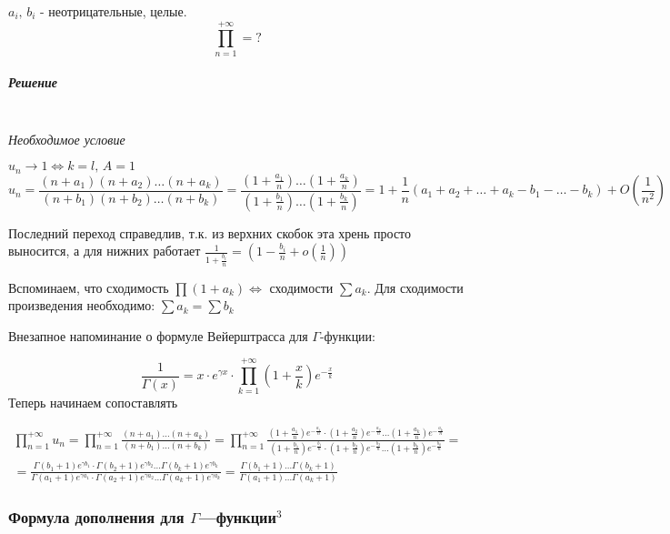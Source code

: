 \documentclass{article}
\let\vanillasubparagraph\subparagraph
\renewcommand{\subparagraph}[1]{\vanillasubparagraph{#1}\mbox{}\\}
\begin{document}
$a_i,\, b_i$ - неотрицательные, целые.
$$
\prod_{n=1}^{+\infty} = ?
$$

\subparagraph{Решение}
\textit{Необходимое условие}

$u_n \to 1 \Leftrightarrow k = l,\, A=1$
$$
u_n = \frac{(n + a_1)(n + a_2) \ldots (n + a_k)}{(n+b_1)(n+b_2) \ldots (n+b_k)} = \frac{\left(1 + \frac{a_1}{n}\right)\ldots\left(1 + \frac{a_k}{n}\right)}{\left(1 + \frac{b_1}{n}\right)\ldots \left(1 + \frac{b_k}{n}\right)} = 1 + \frac{1}{n}\left(a_1 + a_2 + \ldots + a_k - b_1 - \ldots - b_k\right) + O\left(\frac{1}{n^2}\right)
$$

Последний переход справедлив, т.к. из верхних скобок эта хрень просто выносится, а для нижних работает $\frac{1}{1 + \frac{b_i}{n}} = \left(1 - \frac{b_i}{n} + o\left(\frac{1}{n}\right)\right)$

Вспоминаем, что сходимость $\prod(1 + a_k) \Leftrightarrow$ сходимости $\sum a_k$. Для сходимости произведения необходимо: $\sum a_k = \sum b_k$

Внезапное напоминание о формуле Вейерштрасса для $\Gamma$-функции:

$$
\frac{1}{\Gamma(x)} = x \cdot e^{\gamma x} \cdot \prod_{k=1}^{+\infty} \left(1 + \frac{x}{k}\right) e^{-\frac{x}{k}}
$$
Теперь начинаем сопоставлять

\begin{multline*}
    \prod_{n=1}^{+\infty} u_n = \prod_{n=1}^{+\infty} \frac{(n + a_1) \ldots (n + a_k)} {(n + b_1) \ldots (n + b_k)} = \prod_{n=1}^{+\infty} \frac{\left(1 + \frac{a_1}{n}\right)e^{-\frac{a_1}{n}} \cdot \left(1 + \frac{a_2}{n}\right)e^{-\frac{a_2}{n}} \ldots \left(1 + \frac{a_k}{n}\right)e^{-\frac{a_k}{n}}}{\left(1 + \frac{b_1}{n}\right) e^{-\frac{b_1}{n}}\cdot \left(1 + \frac{b_2}{n}\right) e^{-\frac{b_2}{n}} \ldots \left(1 + \frac{b_k}{n}\right) e^{-\frac{b_k}{n}}} = \\ = \frac{\Gamma(b_1+1) e^{\gamma b_1}\cdot \Gamma(b_2+1) e^{\gamma b_2} \ldots \Gamma(b_k+1) e^{\gamma b_k}} {\Gamma (a_1 + 1) e^{\gamma a_1}\cdot \Gamma (a_2 + 1) e^{\gamma a_2} \ldots \Gamma (a_k + 1) e^{\gamma a_k}} = \frac{\Gamma(b_1 + 1) \ldots \Gamma(b_k + 1)} {\Gamma(a_1 + 1) \ldots \Gamma(a_k +1)}
\end{multline*}

\subsubsection{Формула дополнения для \texorpdfstring{$\Gamma$}{}---функции\texorpdfstring{$^3$}{}}
\end{document}
